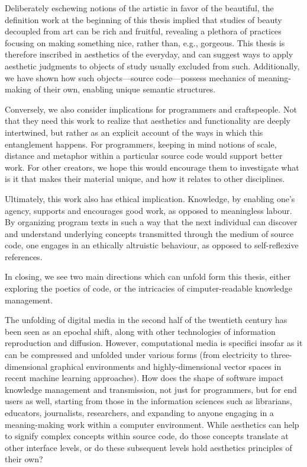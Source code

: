 Deliberately eschewing notions of the artistic in favor of the beautiful, the definition work at the beginning of this thesis implied that studies of beauty decoupled from art can be rich and fruitful, revealing a plethora of practices focusing on making something nice, rather than, e.g., gorgeous. This thesis is therefore inscribed in aesthetics of the everyday, and can suggest ways to apply aesthetic judgments to objects of study usually excluded from such. Additionally, we have shown how such objects—source code—possess mechanics of meaning-making of their own, enabling unique semantic structures.

Conversely, we also consider implications for programmers and craftspeople. Not that they need this work to realize that aesthetics and functionality are deeply intertwined, but rather as an explicit account of the ways in which this entanglement happens. For programmers, keeping in mind notions of scale, distance and metaphor within a particular source code would support better work. For other creators, we hope this would encourage them to investigate what is it that makes their material unique, and how it relates to other disciplines.

Ultimately, this work also has ethical implication. Knowledge, by enabling one's agency, supports and encourages good work, as opposed to meaningless labour. By organizing program texts in such a way that the next individual can discover and understand underlying concepts transmitted through the medium of source code, one engages in an ethically altruistic behaviour, as opposed to self-reflexive references.

\spacer

In closing, we see two main directions which can unfold form this thesis, either exploring the poetics of code, or the intricacies of cimputer-readable knowledge management.

The unfolding of digital media in the second half of the twentieth century has been seen as an epochal shift, along with other technologies of information reproduction and diffusion. However, computational media is specifici insofar as it can be compressed and unfolded under various forms (from electricity to three-dimensional graphical environments and highly-dimensional vector spaces in recent machine learning approaches). How does the shape of software impact knowledge management and transmission, not just for programmers, but for end users as well, starting from those in the information sciences such as librarians, educators, journalists, researchers, and expanding to anyone engaging in a meaning-making work within a computer environment. While aesthetics can help to signify complex concepts within source code, do those concepts translate at other interface levels, or do these subsequent levels hold aesthetics principles of their own?


